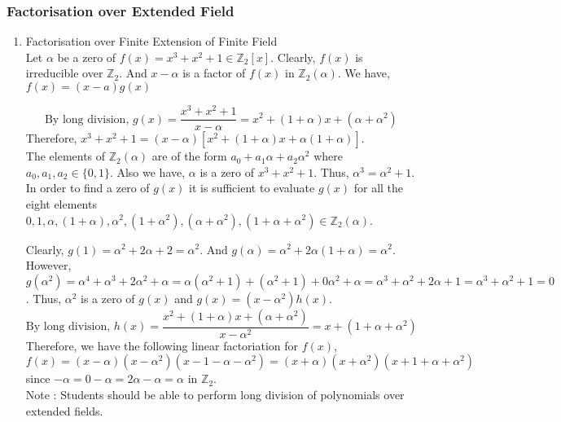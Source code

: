 \subsubsection{Factorisation over Extended Field}
\begin{enumerate}
	\item Factorisation over Finite Extension of Finite Field \cite[Exercise 29.25]{fraleigh}\\
		Let $\alpha$ be a zero of $f(x) = x^3+x^2+1 \in \mathbb{Z}_2[x]$.
		Clearly, $f(x)$ is irreducible over $\mathbb{Z}_2$.
		And $x-\alpha$ is a factor of $f(x)$ in $\mathbb{Z}_2(\alpha)$. We have, $f(x) = (x-a)g(x)$

		$$\text{By long division, } g(x) = \frac{x^3+x^2+1}{x-\alpha} = x^2+(1+\alpha)x+(\alpha+\alpha^2)$$
		Therefore, $x^3+x^2+1 = (x-\alpha)[x^2+(1+\alpha)x+\alpha(1+\alpha)]$.\\

		The elements of $\mathbb{Z}_2(\alpha)$ are of the form $a_0+a_1\alpha+a_2\alpha^2$ where $a_0,a_1,a_2 \in \{0,1\}$.
		Also we have, $\alpha$ is a zero of $x^3+x^2+1$.
		Thus, $\alpha^3 = \alpha^2+1$.\\

		In order to find a zero of $g(x)$ it is sufficient to evaluate $g(x)$ for all the eight elements $ 0, 1, \alpha, (1+\alpha), \alpha^2, (1+\alpha^2),(\alpha+\alpha^2), (1+\alpha+\alpha^2) \in \mathbb{Z}_2(\alpha)$.
		
		Clearly, $g(1) = \alpha^2+2\alpha+2 = \alpha^2$.
		And $g(\alpha) = \alpha^2 + 2\alpha(1+\alpha) = \alpha^2$.
		However, $g(\alpha^2) = \alpha^4+\alpha^3+2\alpha^2+\alpha = \alpha(\alpha^2+1)+(\alpha^2+1) + 0\alpha^2 + \alpha = \alpha^3 + \alpha^2 + 2\alpha + 1 = \alpha^3+\alpha^2+1 = 0$.
		Thus, $\alpha^2$ is a zero of $g(x)$ and $g(x) = (x-\alpha^2)h(x)$.
	$$\text{By long division, } h(x) = \frac{x^2+(1+\alpha)x+(\alpha+\alpha^2)}{x-\alpha^2} = x+(1+\alpha+\alpha^2)$$
		Therefore, we have the following linear factoriation for $f(x)$,\\ $f(x) = (x-\alpha)(x-\alpha^2)(x-1-\alpha-\alpha^2) = (x+\alpha)(x+\alpha^2)(x+1+\alpha+\alpha^2)$ since $-\alpha = 0-\alpha = 2\alpha-\alpha = \alpha$ in $\mathbb{Z}_2$.\\

	Note : Students should be able to perform long division of polynomials over extended fields.
\end{enumerate}

